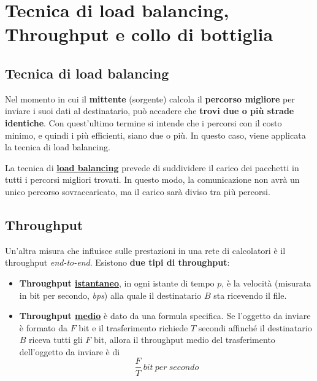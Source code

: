 \documentclass[a4paper]{article}
\begin{document}
	\newpage

	\section{Tecnica di load balancing, Throughput e collo di bottiglia}
	
	\subsection{Tecnica di load balancing}
	
	Nel momento in cui il \textbf{mittente} (sorgente) calcola il \textbf{percorso migliore} per inviare i suoi dati al destinatario, può accadere che \textbf{trovi due o più strade identiche}. Con quest'ultimo termine si intende che i percorsi con il costo minimo, e quindi i più efficienti, siano due o più. In questo caso, viene applicata la tecnica di load balancing.
	
	La tecnica di \textcolor{Red3}{\textbf{\underline{load balancing}}} prevede di suddividere il carico dei pacchetti in tutti i percorsi migliori trovati. In questo modo, la comunicazione non avrà un unico percorso sovraccaricato, ma il carico sarà diviso tra più percorsi.
	
	\subsection{Throughput}
	
	Un’altra misura che influisce sulle prestazioni in una rete di calcolatori è il throughput \emph{end-to-end}. Esistono \textcolor{Red3}{\textbf{due tipi di throughput}}:
	
	\begin{itemize}
		\item \textcolor{Red3}{\textbf{Throughput \underline{istantaneo}}}, in ogni istante di tempo $p$, è la velocità (misurata in bit per secondo, \emph{bps}) alla quale il destinatario $B$ sta ricevendo il file.
		
		\item \textcolor{Red3}{\textbf{Throughput \underline{medio}}} è dato da una formula specifica. Se l'oggetto da inviare è formato da $F$ bit e il trasferimento richiede $T$ secondi affinché il destinatario $B$ riceva tutti gli $F$ bit, allora il throughput medio del trasferimento dell'oggetto da inviare è di
		\begin{equation*}
			\dfrac{F}{T} \: bit \: per \: secondo
		\end{equation*}
	\end{itemize}
\end{document}

